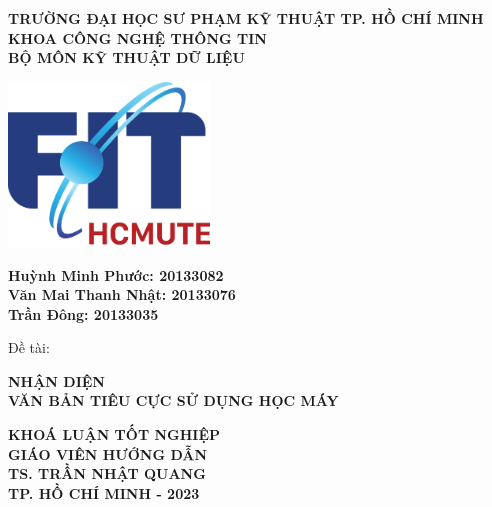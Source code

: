 \thispagestyle{empty}

\begin{center}
    \fontsize{14pt}{21pt}
    \textbf{TRƯỜNG ĐẠI HỌC SƯ PHẠM KỸ THUẬT TP. HỒ CHÍ MINH}\\
    \textbf{KHOA CÔNG NGHỆ THÔNG TIN}\\
    \textbf{BỘ MÔN KỸ THUẬT DỮ LIỆU}\\
\end{center}

\vspace{0.5cm}
\begin{center}
    \includegraphics[width=0.4\textwidth]{prelims/image/logo-cntt2021.png}
\end{center}
\vspace{0.5cm}

\begin{center}
    \fontsize{14pt}{21pt}
    \textbf{Huỳnh Minh Phước: 20133082}\\
    \textbf{Văn Mai Thanh Nhật: 20133076}\\
    \textbf{Trần Đông: 20133035}\\
    \begin{minipage}{0.8\textwidth}
        \fontsize{14pt}{21pt}
        Đề tài:
    \end{minipage}
\end{center}
\begin{center}
    \fontsize{20pt}{30pt}
    \textbf{NHẬN DIỆN\\VĂN BẢN TIÊU CỰC SỬ DỤNG HỌC MÁY}\\
\end{center}
\vspace{0.3cm}
\begin{center}
    \fontsize{14pt}{21pt}
    \textbf{KHOÁ LUẬN TỐT NGHIỆP}\\
    \vspace{1CM}
    \textbf{GIÁO VIÊN HƯỚNG DẪN}\\
    \textbf{TS. TRẦN NHẬT QUANG}\\
    \vfill
    \textbf{TP. HỒ CHÍ MINH - 2023}
\end{center}
\restoregeometry
